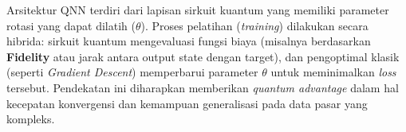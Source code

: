 Arsitektur QNN terdiri dari lapisan sirkuit kuantum yang memiliki parameter rotasi yang dapat dilatih ($\theta$). Proses pelatihan (\textit{training}) dilakukan secara hibrida: sirkuit kuantum mengevaluasi fungsi biaya (misalnya berdasarkan \textbf{Fidelity} atau jarak antara output state dengan target), dan pengoptimal klasik (seperti \textit{Gradient Descent}) memperbarui parameter $\theta$ untuk meminimalkan \textit{loss} tersebut. Pendekatan ini diharapkan memberikan \textit{quantum advantage} dalam hal kecepatan konvergensi dan kemampuan generalisasi pada data pasar yang kompleks.
